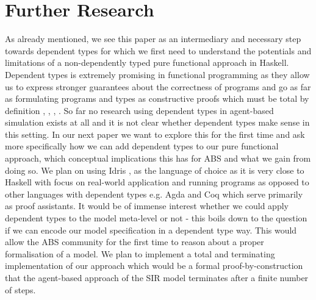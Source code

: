\section{Further Research}
As already mentioned, we see this paper as an intermediary and necessary step towards dependent types for which we first need to understand the potentials and limitations of a non-dependently typed pure functional approach in Haskell. Dependent types is extremely promising in functional programming as they allow us to express stronger guarantees about the correctness of programs and go as far as formulating programs and types as constructive proofs \cite{wadler_propositions_2015} which must be total by definition \cite{thompson_type_1991}, \cite{altenkirch_why_2005}, \cite{altenkirch_pi_sigma:_2010}, \cite{program_homotopy_2013}. So far no research using dependent types in agent-based simulation exists at all and it is not clear whether dependent types make sense in this setting. In our next paper we want to explore this for the first time and ask more specifically how we can add dependent types to our pure functional approach, which conceptual implications this has for ABS and what we gain from doing so. We plan on using Idris \cite{brady_idris_2013}, \cite{brady_type-driven_2017} as the language of choice as it is very close to Haskell with focus on real-world application and running programs as opposed to other languages with dependent types e.g. Agda and Coq which serve primarily as proof assistants.
It would be of immense interest whether we could apply dependent types to the model meta-level or not - this boils down to the question if we can encode our model specification in a dependent type way. This would allow the ABS community for the first time to reason about a proper formalisation of a model. We plan to implement a total and terminating implementation of our approach which would be a formal proof-by-construction that the agent-based approach of the SIR model terminates after a finite number of steps.